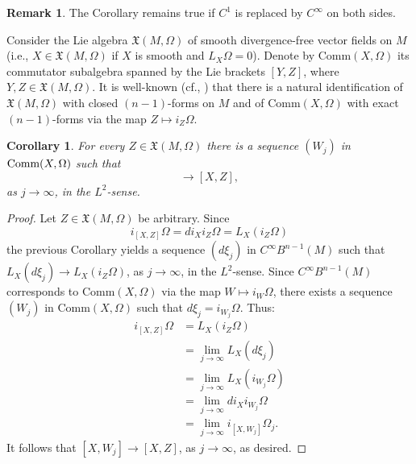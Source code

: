 \documentclass[11pt,letterpaper,reqno,abstract=true]{scrartcl}
\theoremstyle{plain}                              %
\newtheorem{cor}[thm]{Corollary}
\theoremstyle{definition}                         %
\newtheorem*{remark}{Remark}
\theoremstyle{remark}                             %
\begin{document}
    \begin{remark}
      The Corollary remains true if $C^1$ is replaced by $C^\infty$
      on both sides.
    \end{remark}

    Consider the Lie algebra $\mathfrak{X}(M,\Omega)$ of smooth
    divergence-free vector fields on $M$ (i.e.,
    $X \in \mathfrak{X}(M,\Omega)$ if $X$ is smooth and
    $L_X \Omega = 0$). Denote by $\text{Comm}(X,\Omega)$ its
    \textsf{commutator} subalgebra spanned by the Lie brackets $[Y,Z]$,
    where $Y, Z \in \mathfrak{X}(M,\Omega)$. It is well-known (cf.,
    \cite{arnold+69, lichnerowicz+74}) that
    there is a natural identification of $\mathfrak{X}(M,\Omega)$ with
    closed $(n-1)$-forms on $M$ and of $\text{Comm}(X,\Omega)$ with
    exact $(n-1)$-forms via the map $Z \mapsto i_Z \Omega$.

    \begin{cor}
      For every $Z \in \mathfrak{X}(M,\Omega)$ there is a sequence
      $(W_j)$ in $\text{\normalfont Comm}(X,\Omega)$ such that
      \begin{displaymath}
        [X,W_j] \to [X,Z],
      \end{displaymath}
      as $j \to \infty$, in the $L^2$-sense.
    \end{cor}

    \begin{proof}
      Let $Z \in \mathfrak{X}(M,\Omega)$ be arbitrary. Since
      \begin{displaymath}
        i_{[X,Z]}  \Omega = d i_X i_Z \Omega = L_X (i_Z \Omega)
      \end{displaymath}
      the previous Corollary yields a sequence $(d \xi_j)$ in $C^\infty
      B^{n-1}(M)$ such that $L_X (d\xi_j) \to L_X (i_Z \Omega)$, as $j
      \to \infty$, in the $L^2$-sense. Since $C^\infty B^{n-1}(M)$
      corresponds to $\text{Comm}(X,\Omega)$ via the map $W \mapsto
      i_W \Omega$, there exists a sequence $(W_j)$ in
      $\text{Comm}(X,\Omega)$ such that $d\xi_j = i_{W_j} \Omega$. Thus:
      \begin{align*}
        i_{[X,Z]} \Omega & = L_X (i_Z \Omega) \\
                         & = \lim_{j \to \infty} L_X (d\xi_j) \\
                         & = \lim_{j \to \infty} L_X (i_{W_j} \Omega) \\
                         & = \lim_{j \to \infty} d i_X i_{W_j} \Omega \\
                         & = \lim_{j \to \infty} i_{[X,W_j]} \Omega_j.
      \end{align*}
      It follows that $[X,W_j] \to [X,Z]$, as $j \to \infty$, as
      desired.
    \end{proof}
\end{document}

